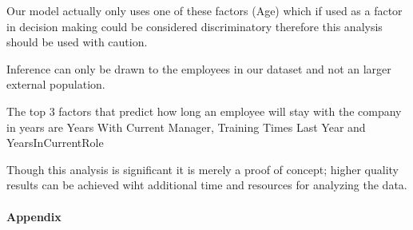 \documentclass[]{article}
\let\oldparagraph\paragraph
\renewcommand{\paragraph}[1]{\oldparagraph{#1}\mbox{}}
\begin{document}
Our model actually only uses one of these factors (Age) which if used as
a factor in decision making could be considered discriminatory therefore
this analysis should be used with caution.

Inference can only be drawn to the employees in our dataset and not an
larger external population.

The top 3 factors that predict how long an employee will stay with the
company in years are Years With Current Manager, Training Times Last
Year and YearsInCurrentRole

Though this analysis is significant it is merely a proof of concept;
higher quality results can be achieved wiht additional time and
resources for analyzing the data.

\paragraph{Appendix}\label{appendix}
\end{document}
